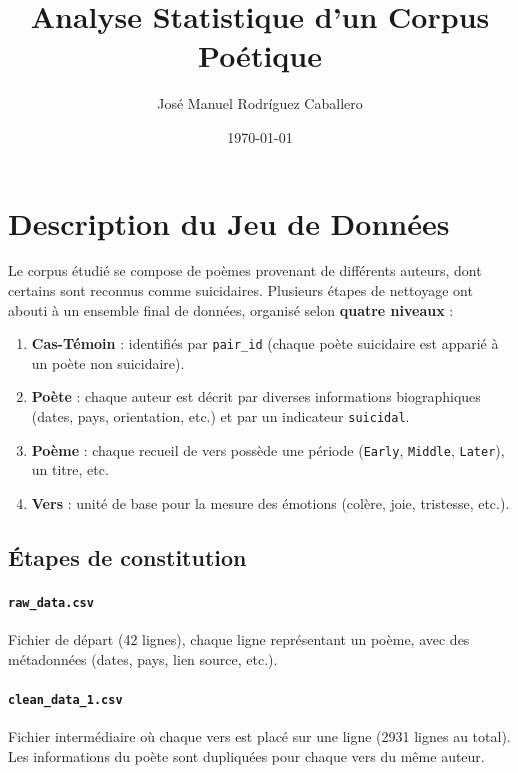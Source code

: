 \documentclass[12pt,a4paper]{article}
\title{Analyse Statistique d'un Corpus Poétique}
\author{José Manuel Rodríguez Caballero}
\date{\today}
\begin{document}
	
	\maketitle
	\tableofcontents
	
	\section{Description du Jeu de Données}
	
	Le corpus étudié se compose de poèmes provenant de différents auteurs, 
	dont certains sont reconnus comme suicidaires. Plusieurs étapes de nettoyage 
	ont abouti à un ensemble final de données, organisé selon \textbf{quatre niveaux} :
	
	\begin{enumerate}
		\item \textbf{Cas-Témoin} : identifiés par \texttt{pair\_id} 
		(chaque poète suicidaire est apparié à un poète non suicidaire).
		\item \textbf{Poète} : chaque auteur est décrit par diverses informations biographiques 
		(dates, pays, orientation, etc.) et par un indicateur \texttt{suicidal}.
		\item \textbf{Poème} : chaque recueil de vers possède une période (\texttt{Early}, \texttt{Middle}, 
		\texttt{Later}), un titre, etc.
		\item \textbf{Vers} : unité de base pour la mesure des émotions (colère, joie, tristesse, etc.).
	\end{enumerate}
	
	\subsection{Étapes de constitution}
	\paragraph{\texttt{raw\_data.csv}}  
	Fichier de départ (42 lignes), chaque ligne représentant un poème, 
	avec des métadonnées (dates, pays, lien source, etc.).
	
	\paragraph{\texttt{clean\_data\_1.csv}}  
	Fichier intermédiaire où chaque vers est placé sur une ligne 
	(2931 lignes au total). Les informations du poète sont dupliquées 
	pour chaque vers du même auteur.
	
\end{document}
